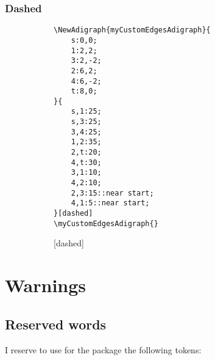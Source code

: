 \documentclass{report}
\begin{document}
\subsection{Dashed}
\begin{figure}
	\begin{subfigure}{0.49\textwidth}
		\begin{verbatim}
\NewAdigraph{myCustomEdgesAdigraph}{
	s:0,0;
	1:2,2;
	3:2,-2;
	2:6,2;
	4:6,-2;
	t:8,0;
}{
	s,1:25;
	s,3:25;
	3,4:25;
	1,2:35;
	2,t:20;
	4,t:30;
	3,1:10;
	4,2:10;
	2,3:15::near start;
	4,1:5::near start;
}[dashed]
\myCustomEdgesAdigraph{}
\end{verbatim}
	\end{subfigure}
	\begin{subfigure}{0.49\textwidth}
		[dashed]
		\myCustomEdgesAdigraph{}
	\end{subfigure}
\end{figure}


\chapter{Warnings}
\section{Reserved words}
I reserve to use for the package the following tokens:
\end{document}
